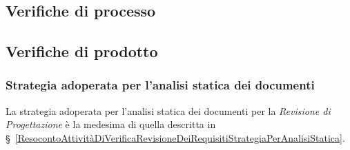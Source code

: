 {{{{\subsection{Verifiche di processo}\label{ResocontoAttivitàDiVerificaRevisioneDiQualificaVerificheDiProcesso}

\subsection{Verifiche di prodotto}\label{ResocontoAttivitàDiVerificaRevisioneDiQualificaVerificheDiProdotto}

\subsubsection{Strategia adoperata per l'analisi statica dei documenti}\label{ResocontoAttivitàDiVerificaRevisioneDiQualificaVerificheDiProdottoStrategiaAdoperataPerLAnalisiStaticaDeiDocumenti}
La strategia adoperata per l’analisi statica dei documenti per la \textit{Revisione di Progettazione} è la medesima di quella descritta in \S~\ref{ResocontoAttivitàDiVerificaRevisioneDeiRequisitiStrategiaPerAnalisiStatica}.

}}}}
